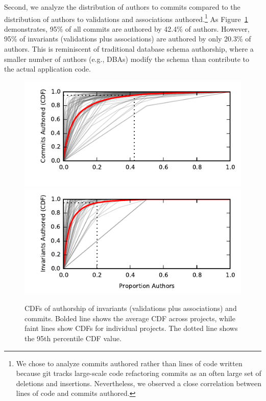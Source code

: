Second, we analyze the distribution of authors to commits compared to
the distribution of authors to validations and associations
authored.\footnote{We chose to analyze commits authored rather than
  lines of code written because git tracks large-scale code
  refactoring commits as an often large set of deletions and
  insertions. Nevertheless, we observed a close correlation between
  lines of code and commits authored.} As Figure~\ref{fig:cdfs}
demonstrates, 95\% of all commits are authored by 42.4\% of
authors. However, 95\% of invariants (validations plus associations)
are authored by only 20.3\% of authors. This is reminiscent of
traditional database schema authorship, where a smaller number of
authors (e.g., DBAs) modify the schema than contribute to the actual
application code.

\begin{figure}
  \newcommand{\skipht}{\\[-2em]}
\includegraphics[width=\columnwidth]{figs/commit-authorship-cdf.pdf}\vspace{-2em}
\includegraphics[width=\columnwidth]{figs/invariant-authorship-cdf.pdf}\vspace{-1em}
\caption{CDFs of authorship of invariants (validations plus
  associations) and commits. Bolded line
  shows the average CDF across projects, while faint lines show CDFs
  for individual projects. The dotted line shows the 95th percentile
  CDF value. }
\label{fig:cdfs}
\end{figure}

